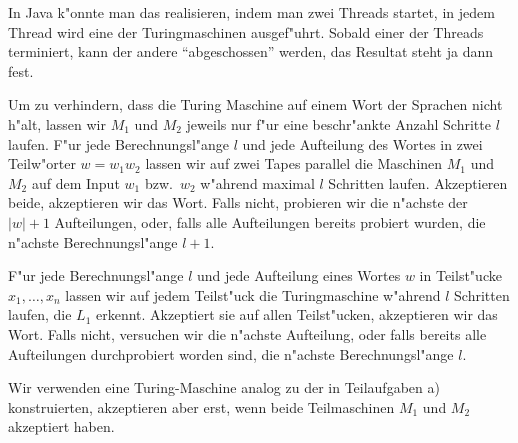 \begin{loesung}
\begin{teilaufgaben}
In Java k"onnte man das realisieren, indem man zwei Threads startet,
in jedem Thread wird eine der Turingmaschinen ausgef"uhrt. Sobald
einer der Threads terminiert, kann der andere ``abgeschossen'' werden,
das Resultat steht ja dann fest.
\item
Um zu verhindern, dass die Turing Maschine auf einem Wort der
Sprachen nicht h"alt, lassen wir $M_1$ und $M_2$ jeweils nur f"ur eine
beschr"ankte Anzahl Schritte $l$ laufen.
F"ur jede Berechnungsl"ange $l$ und jede Aufteilung des Wortes in zwei
Teilw"orter $w=w_1w_2$ lassen wir auf zwei Tapes parallel die
Maschinen $M_1$ und $M_2$ auf dem Input $w_1$ bzw.~$w_2$ w"ahrend
maximal $l$ Schritten laufen. Akzeptieren beide, akzeptieren wir das
Wort. Falls nicht, probieren wir die n"achste der $|w|+1$ Aufteilungen,
oder, falls alle Aufteilungen bereits probiert wurden, die n"achste
Berechnungsl"ange $l+1$.
\item
F"ur jede Berechnungsl"ange $l$ und
jede Aufteilung eines Wortes $w$ in Teilst"ucke $x_1,\dots,x_n$
lassen
wir auf jedem Teilst"uck die Turingmaschine w"ahrend $l$ Schritten
laufen, die
$L_1$ erkennt. Akzeptiert sie auf allen Teilst"ucken, akzeptieren wir
das Wort. Falls nicht, versuchen wir die n"achste Aufteilung, oder falls
bereits alle Aufteilungen durchprobiert worden sind, die n"achste Berechnungsl"ange $l$.
\item Wir verwenden eine Turing-Maschine analog zu der in Teilaufgaben a)
konstruierten, akzeptieren aber erst, wenn beide Teilmaschinen
$M_1$ und $M_2$ akzeptiert haben.
\end{teilaufgaben}
\end{loesung}
